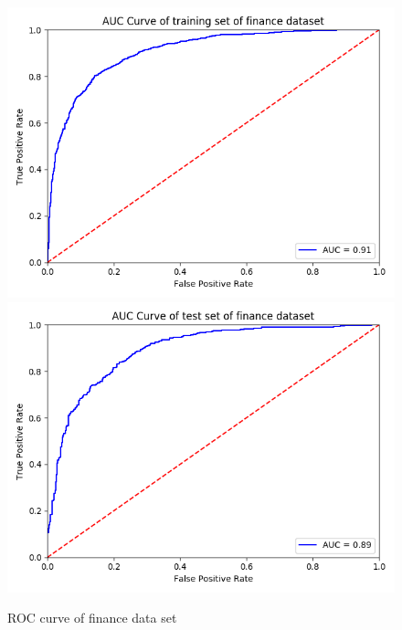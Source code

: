 \documentclass{article}
\begin{document}
\begin{figure}[h]
  \centering
  \includegraphics[scale=0.3]{finance_auc_train.png}
  \includegraphics[scale=0.3]{finance_auc_test.png}
  \caption{ROC curve of finance data set}
\end{figure}
\end{document}
